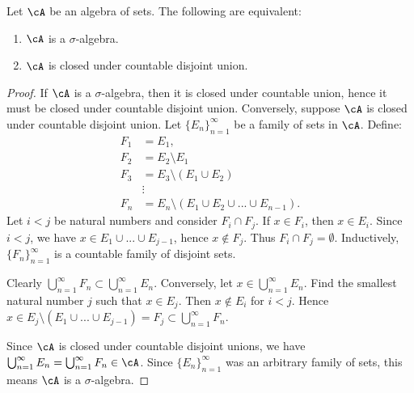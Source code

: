     \begin{proposition}
        Let $\cA$ be an algebra of sets. The following are equivalent:
            \begin{enumerate}[label = (\arabic*),itemsep=1pt,topsep=3pt]
                \item $\cA$ is a $\sigma$-algebra.
                \item $\cA$ is closed under countable disjoint union.
            \end{enumerate}
    \end{proposition}
        \begin{proof}
            If $\cA$ is a $\sigma$-algebra, then it is closed under countable union, hence it must be closed under countable disjoint union. Conversely, suppose $\cA$ is closed under countable disjoint union. Let $\{E_n\}_{n = 1}^\infty$ be a family of sets in $\cA$. Define:
                \begin{equation*}
                \begin{split}
                    F_1 &= E_1, \\
                    F_2 &= E_2 \setminus E_1 \\
                    F_3 &= E_3 \setminus (E_1 \cup E_2) \\
                    &\vdots \\
                    F_n &= E_n \setminus \left( E_1 \cup E_2 \cup ... \cup E_{n-1} \right).
                \end{split}
                \end{equation*}
            Let $i < j$ be natural numbers and consider $F_i \cap F_j$. If $x \in F_i$, then $x \in E_i$. Since $i < j$, we have $x \in E_1 \cup ... \cup E_{j-1}$, hence $x \not\in F_j$. Thus $F_i \cap F_j = \emptyset$. Inductively, $\{F_n\}_{n = 1}^\infty$ is a countable family of disjoint sets.

            Clearly $\bigcup_{n = 1}^\infty F_n \subset \bigcup_{n = 1}^\infty E_n$. Conversely, let $x \in \bigcup_{n = 1}^\infty E_n$. Find the smallest natural number $j$ such that $x \in E_j$. Then $x \not\in E_i$ for $i < j$. Hence $x \in E_j \setminus (E_1 \cup ... \cup E_{j-1}) = F_j \subset \bigcup_{n=1}^\infty F_n$.

            Since $\cA$ is closed under countable disjoint unions, we have $\bigcup_{n = 1}^\infty E_n = \bigcup_{n = 1}^\infty F_n \in \cA$. Since $\{E_n\}_{n = 1}^\infty$ was an arbitrary family of sets, this means $\cA$ is a $\sigma$-algebra.
        \end{proof}

